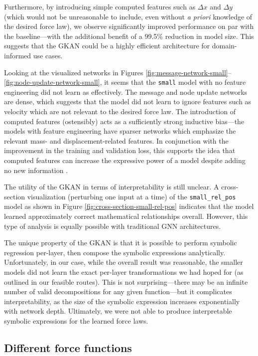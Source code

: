 \documentclass{article}
\begin{document}
Furthermore, by introducing simple computed features such as $\Delta x$ and $\Delta y$ (which would not be unreasonable to include, even without \textit{a priori} knowledge of the desired force law), we observe significantly improved performance on par with the baseline---with the additional benefit of a 99.5\% reduction in model size. This suggests that the GKAN could be a highly efficient architecture for domain-informed use cases.

Looking at the visualized networks in Figures \ref{fig:message-network-small}--\ref{fig:node-update-network-small}, it seems that the \texttt{small} model with no feature engineering did not learn as effectively. The message and node update networks are dense, which suggests that the model did not learn to ignore features such as velocity which are not relevant to the desired force law. The introduction of computed features (ostensibly) acts as a  sufficiently strong inductive bias---the models with feature engineering have sparser networks which emphasize the relevant mass- and displacement-related features. In conjunction with the improvement in the training and validation loss, this supports the idea that computed features can increase the expressive power of a model despite adding no new information \parencite{liu2024kan20kolmogorovarnoldnetworks}.

The utility of the GKAN in terms of interpretability is still unclear. A cross-section visualization (perturbing one input at a time) of the \texttt{small\_rel\_pos} model as shown in Figure \ref{fig:cross-section-small-rel-pos} indicates that the model learned approximately correct mathematical relationships overall. However, this type of analysis is equally possible with traditional GNN architectures.

The unique property of the GKAN is that it is possible to perform symbolic regression per-layer, then compose the symbolic expressions analytically. Unfortunately, in our case, while the overall result was reasonable, the smaller models did not learn the exact per-layer transformations we had hoped for (as outlined in our feasible routes). This is not surprising---there may be an infinite number of valid decompositions for any given function---but it complicates interpretability, as the size of the symbolic expression increases exponentially with network depth. Ultimately, we were not able to produce interpretable symbolic expressions for the learned force laws.

\subsection{Different force functions}
\end{document}
